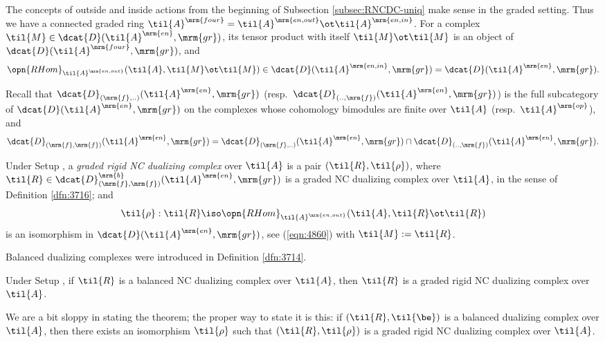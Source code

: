 The concepts of outside and inside actions from the beginning of Subsection 
\ref{subsec:RNCDC-uniq} make sense in the graded setting. Thus we have a 
connected graded ring 
$\til{A}^{\mrm{four}} = \til{A}^{\mrm{en, out}} \ot \til{A}^{\mrm{en, in}}$. 
For a complex
$\til{M} \in \dcat{D}(\til{A}^{\mrm{en}}, \mrm{gr})$,
its tensor product with itself $\til{M} \ot \til{M}$
is an object of 
$\dcat{D}(\til{A}^{\mrm{four}}, \mrm{gr})$,
and 
\begin{equation} \label{eqn:4860}
\opn{RHom}_{\til{A}^{\mrm{en, out}}} ( \til{A}, \til{M} \ot \til{M} )
\in \dcat{D}(\til{A}^{\mrm{en, in}}, \mrm{gr}) = 
\dcat{D}(\til{A}^{\mrm{en}}, \mrm{gr}) . 
\end{equation}

Recall that 
$\dcat{D}_{(\mrm{f},..)}(\til{A}^{\mrm{en}}, \mrm{gr})$
(resp.\ $\dcat{D}_{(.., \mrm{f})}(\til{A}^{\mrm{en}}, \mrm{gr})$)
is the full subcategory of \lb 
$\dcat{D}(\til{A}^{\mrm{en}}, \mrm{gr})$
on the complexes whose cohomology bimodules are finite over $\til{A}$
(resp.\  $\til{A}^{\mrm{op}}$), and 
\[ \dcat{D}_{(\mrm{f}, \mrm{f})}(\til{A}^{\mrm{en}}, \mrm{gr}) = 
\dcat{D}_{(\mrm{f},..)}(\til{A}^{\mrm{en}}, \mrm{gr}) \cap 
\dcat{D}_{(.., \mrm{f})}(\til{A}^{\mrm{en}}, \mrm{gr}) . \]

\begin{dfn} \label{dfn:4391} 
Under Setup \tup{\ref{set:4510}}, a 
{\em graded rigid NC dualizing complex}%
over $\til{A}$ is a pair $(\til{R}, \til{\rho})$, where 
$\til{R} \in \dcat{D}^{\mrm{b}}_{(\mrm{f}, \mrm{f})}
(\til{A}^{\mrm{en}}, \mrm{gr})$
is a graded NC dualizing complex over $\til{A}$, in the sense of Definition 
\ref{dfn:3716}; and 
\[ \til{\rho} : \til{R} \iso 
\opn{RHom}_{\til{A}^{\mrm{en, out}}} ( \til{A}, \til{R} \ot \til{R} ) \]
is an isomorphism in $\dcat{D}(\til{A}^{\mrm{en}}, \mrm{gr})$,
see (\ref{eqn:4860}) with $\til{M} := \til{R}$.  
\end{dfn}

Balanced dualizing complexes were introduced in Definition \ref{dfn:3714}.

\begin{thm} \label{thm:4400}
Under Setup \tup{\ref{set:4510}}, if $\til{R}$ is a balanced NC dualizing 
complex over $\til{A}$, then $\til{R}$ is a graded rigid NC dualizing complex 
over $\til{A}$.
\end{thm}

We are a bit sloppy in stating the theorem; the proper way to state it is this:
if $(\til{R}, \til{\be})$ is a balanced dualizing complex over $\til{A}$, then 
there exists an isomorphism $\til{\rho}$ such that $(\til{R}, \til{\rho})$ is a 
graded rigid NC dualizing complex over $\til{A}$.


